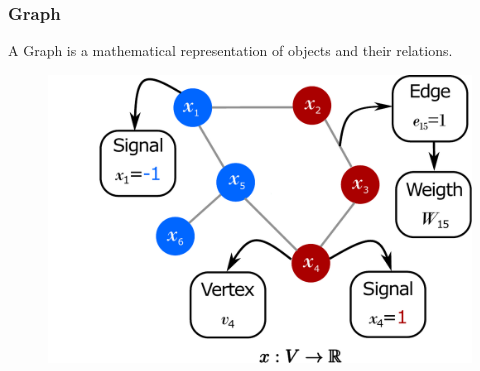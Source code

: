\documentclass[11pts]{beamer}
\begin{document}



\begin{frame}%
\frametitle{Graph}
A Graph is a mathematical representation of objects and their relations. 
 \begin{figure}
     \centering
     \includegraphics[scale=0.5]{IM/GRAPH.pdf}
 \end{figure}

\end{frame}
\end{document}
